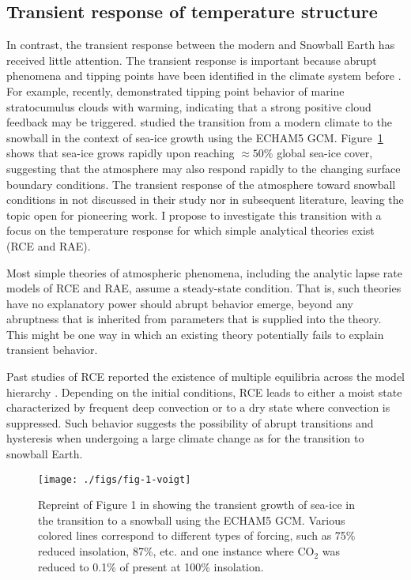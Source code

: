 \documentclass{article}
\begin{document}
\subsection{Transient response of temperature structure}

In contrast, the transient response between the modern and Snowball Earth has received little attention. The transient response is important because abrupt phenomena and tipping points have been identified in the climate system before \citep{alley-et-al-2003}. For example, recently, \citet{schneider-et-al-2019} demonstrated tipping point behavior of marine stratocumulus clouds with warming, indicating that a strong positive cloud feedback may be triggered. \citet{voigt-marotzke-2010} studied the transition from a modern climate to the snowball in the context of sea-ice growth using the ECHAM5 GCM. Figure~\ref{fig:fig-1-voigt} shows that sea-ice grows rapidly upon reaching $\approx 50$\% global sea-ice cover, suggesting that the atmosphere may also respond rapidly to the changing surface boundary conditions. The transient response of the atmosphere toward snowball conditions in not discussed in their study nor in subsequent literature, leaving the topic open for pioneering work. I propose to investigate this transition with a focus on the temperature response for which simple analytical theories exist (RCE and RAE).

Most simple theories of atmospheric phenomena, including the analytic lapse rate models of RCE and RAE, assume a steady-state condition. That is, such theories have no explanatory power should abrupt behavior emerge, beyond any abruptness that is inherited from parameters that is supplied into the theory. This might be one way in which an existing theory potentially fails to explain transient behavior.

Past studies of RCE reported the existence of multiple equilibria across the model hierarchy \citep{renno-1997, sobel-et-al-2007, sessions-et-al-2010}. Depending on the initial conditions, RCE leads to either a moist state characterized by frequent deep convection or to a dry state where convection is suppressed. Such behavior suggests the possibility of abrupt transitions and hysteresis when undergoing a large climate change as for the transition to snowball Earth.

\begin{figure}
\centering
\texttt{[image: ./figs/fig-1-voigt]}
\caption{Repreint of Figure 1 in \citep{voigt-marotzke-2010} showing the transient growth of sea-ice in the transition to a snowball using the ECHAM5 GCM. Various colored lines correspond to different types of forcing, such as 75\% reduced insolation, 87\%, etc. and one instance where CO$_2$ was reduced to 0.1\% of present at 100\% insolation.}
\label{fig:fig-1-voigt}
\end{figure}
\end{document}
